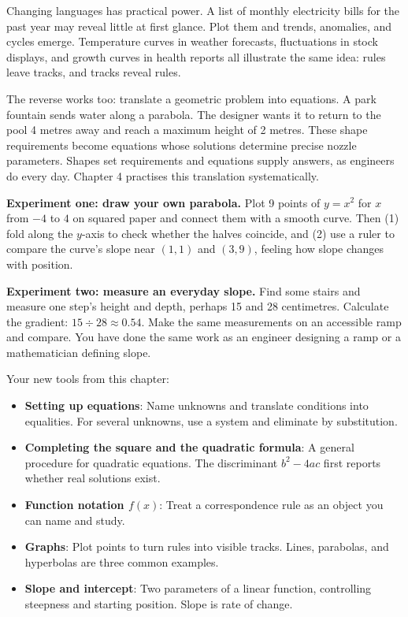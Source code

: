 Changing languages has practical power. A list of monthly electricity bills for the past year may reveal little at first glance. Plot them and trends, anomalies, and cycles emerge. Temperature curves in weather forecasts, fluctuations in stock displays, and growth curves in health reports all illustrate the same idea: rules leave tracks, and tracks reveal rules.

The reverse works too: translate a geometric problem into equations. A park fountain sends water along a parabola. The designer wants it to return to the pool 4 metres away and reach a maximum height of 2 metres. These shape requirements become equations whose solutions determine precise nozzle parameters. Shapes set requirements and equations supply answers, as engineers do every day. Chapter 4 practises this translation systematically.

\begin{shiyan}
\textbf{Experiment one: draw your own parabola.} Plot 9 points of $y = x^2$ for $x$ from $-4$ to $4$ on squared paper and connect them with a smooth curve. Then (1) fold along the $y$-axis to check whether the halves coincide, and (2) use a ruler to compare the curve's slope near $(1,1)$ and $(3,9)$, feeling how slope changes with position.

\textbf{Experiment two: measure an everyday slope.} Find some stairs and measure one step's height and depth, perhaps 15 and 28 centimetres. Calculate the gradient: $15 \div 28 \approx 0.54$. Make the same measurements on an accessible ramp and compare. You have done the same work as an engineer designing a ramp or a mathematician defining slope.
\end{shiyan}

\begin{toolbox}
Your new tools from this chapter:
\begin{itemize}
\item \textbf{Setting up equations}: Name unknowns and translate conditions into equalities. For several unknowns, use a system and eliminate by substitution.
\item \textbf{Completing the square and the quadratic formula}: A general procedure for quadratic equations. The discriminant $b^2 - 4ac$ first reports whether real solutions exist.
\item \textbf{Function notation $f(x)$}: Treat a correspondence rule as an object you can name and study.
\item \textbf{Graphs}: Plot points to turn rules into visible tracks. Lines, parabolas, and hyperbolas are three common examples.
\item \textbf{Slope and intercept}: Two parameters of a linear function, controlling steepness and starting position. Slope is rate of change.
\end{itemize}
\end{toolbox}

